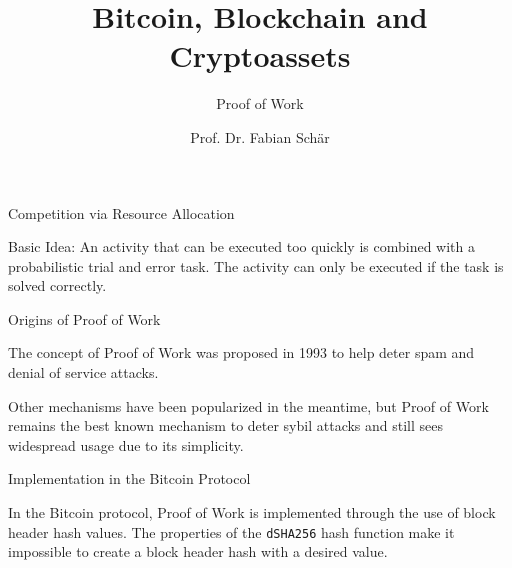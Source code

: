 \documentclass[handout]{beamer}
\title{Bitcoin, Blockchain and Cryptoassets}
\subtitle{Proof of Work}
\author{Prof. Dr. Fabian Schär}
\institute{University of Basel}
\begin{document}
\thispagestyle{empty}
\begin{frame}[noframenumbering]
	\titlepage
\end{frame}

\begin{frame}{Competition via Resource Allocation}

Basic Idea: An activity that can be executed too quickly is \color{focus}combined with a probabilistic trial and error task\color{black}. The activity can only be executed if the task is solved correctly.

\end{frame}

\begin{frame}{Origins of Proof of Work}
	
	The concept of Proof of Work was proposed in 1993 \cite{dwork_pricing_1993} to help deter spam and denial of service attacks. 
	
	\vspace{1.5em}
	
	Other mechanisms have been popularized in the meantime, but Proof of Work remains the best known mechanism to deter sybil attacks and still sees widespread usage due to its simplicity.

\end{frame}

\begin{frame}{Implementation in the Bitcoin Protocol}

In the Bitcoin protocol, Proof of Work is implemented through the use of \color{focus}block header hash values\color{black}. The properties of the \texttt{dSHA256} hash function make it impossible to create a block header hash with a desired value.


 	
\end{frame}
\end{document}
